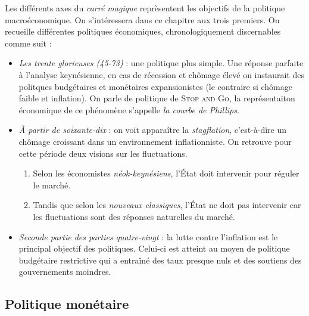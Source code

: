 Les différents axes du \emph{carré magique} reprèsentent les objectifs de la politique macroéconomique. 
On s'intéressera dans ce chapitre aux trois premiers. 
On recueille différentes politiques économiques, chronologiquement discernables comme suit : 
\begin{itemize}[label=]
	\item \emph{Les trente glorieuses (45-73)} : une politique plus simple. 
  Une réponse parfaite à l'analyse keynésienne, en cas de récession et chômage élevé
	on instaurait des politques budgétaires et monétaires expansionistes (le contraire si chômage faible
  et inflation). On parle de politique de \textsc{Stop and Go}, la représentaiton économique 
  de ce phénomène s'appelle \emph{la courbe de Phillips}.
	\item \emph{À partir de soixante-dix} : on voit apparaître la \emph{stagflation}, c'est-à-dire un
  chômage croissant dans un environnement inflationniste. On retrouve pour cette période deux visions
  sur les fluctuations.
  \begin{enumerate}
    \item Selon les économistes \emph{néok-keynésiens}, l'État doit intervenir pour réguler le marché.
    \item Tandis que selon les \emph{nouveaux classiques}, l'État ne doit pas intervenir car les fluctuations
    sont des réponses naturelles du marché.
  \end{enumerate}
  \item \emph{Seconde partie des parties quatre-vingt} : la lutte contre l'inflation est le principal
  objectif des politiques. Celui-ci est atteint au moyen de politique budgétaire restrictive
  qui a entraîné des taux presque nuls et des soutiens des gouvernements moindres.
\end{itemize}

\subsection{Politique monétaire} %
\label{sub:politique_monetaire}


